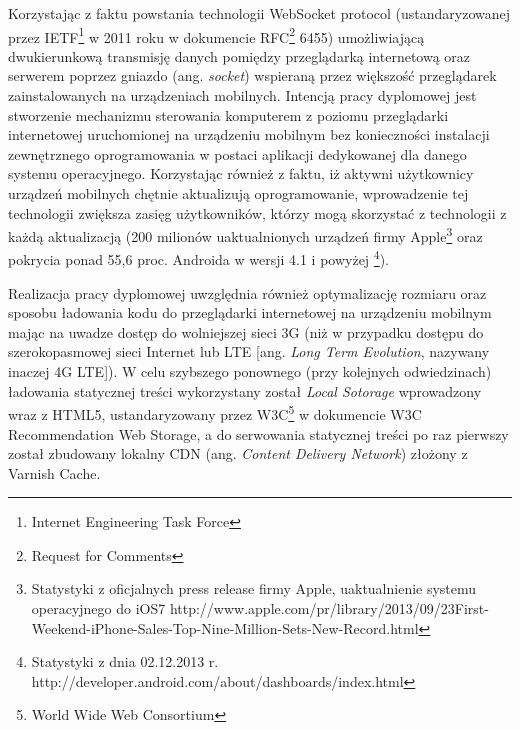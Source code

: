 Korzystając z faktu powstania technologii WebSocket protocol (ustandaryzowanej przez IETF\footnote{Internet Engineering Task Force} w 2011 roku w dokumencie RFC\footnote{Request for Comments} 6455\cite{websockets-rfc}) umożliwiającą dwukierunkową transmisję danych pomiędzy przeglądarką internetową oraz serwerem poprzez gniazdo (ang. \emph{socket})  wspieraną przez większość przeglądarek zainstalowanych na urządzeniach mobilnych. Intencją pracy dyplomowej jest stworzenie mechanizmu sterowania komputerem z poziomu przeglądarki internetowej uruchomionej na urządzeniu mobilnym bez konieczności instalacji zewnętrznego oprogramowania w postaci aplikacji dedykowanej dla danego systemu operacyjnego. Korzystając również z faktu, iż aktywni użytkownicy urządzeń mobilnych chętnie aktualizują oprogramowanie, wprowadzenie tej technologii zwiększa zasięg użytkowników, którzy mogą skorzystać z technologii z każdą aktualizacją (200 milionów uaktualnionych urządzeń firmy Apple\footnote{Statystyki z oficjalnych press release firmy Apple, uaktualnienie systemu operacyjnego do iOS7 http://www.apple.com/pr/library/2013/09/23First-Weekend-iPhone-Sales-Top-Nine-Million-Sets-New-Record.html} oraz pokrycia ponad 55,6 proc. Androida w wersji 4.1 i powyżej \footnote{Statystyki z dnia 02.12.2013 r. http://developer.android.com/about/dashboards/index.html}).

Realizacja pracy dyplomowej uwzględnia również optymalizację rozmiaru oraz sposobu ładowania kodu do przeglądarki internetowej na urządzeniu mobilnym mając na uwadze dostęp do wolniejszej sieci 3G (niż w przypadku dostępu do szerokopasmowej sieci Internet lub LTE [ang. \emph{Long Term Evolution}, nazywany inaczej 4G LTE]). W celu szybszego ponownego (przy kolejnych odwiedzinach) ładowania statycznej treści wykorzystany został \emph{Local Sotorage}\cite{webstorage} wprowadzony wraz z HTML5, ustandaryzowany przez W3C\footnote{World Wide Web Consortium} w dokumencie W3C Recommendation Web Storage, a do serwowania statycznej treści po raz pierwszy został zbudowany lokalny CDN (ang. \emph{Content Delivery Network}) złożony z Varnish Cache.
